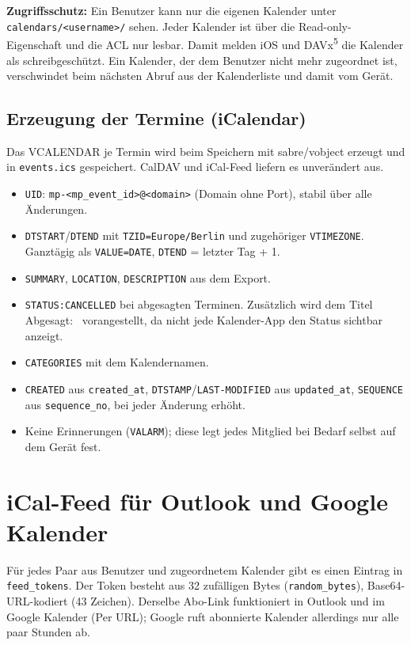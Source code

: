 \documentclass[a4paper,fontsize=10pt]{scrartcl}
\newcommand{\code}[1]{\texttt{#1}}
\begin{document}
\textbf{Zugriffsschutz:} Ein Benutzer kann nur die eigenen Kalender unter
\code{calendars/<username>/} sehen. Jeder Kalender ist über die
Read-only-Eigenschaft und die ACL nur lesbar. Damit melden iOS und
DAVx\textsuperscript{5} die Kalender als schreibgeschützt. Ein
Kalender, der dem Benutzer nicht mehr zugeordnet ist, verschwindet beim
nächsten Abruf aus der Kalenderliste und damit vom Gerät.

\subsection{Erzeugung der Termine (iCalendar)}

Das VCALENDAR je Termin wird beim Speichern mit sabre/vobject erzeugt und in
\code{events.ics} gespeichert. CalDAV und iCal-Feed liefern es unverändert
aus.

\begin{itemize}
  \item \code{UID}: \code{mp-<mp\_event\_id>@<domain>} (Domain ohne Port),
        stabil über alle Änderungen.
  \item \code{DTSTART}/\code{DTEND} mit \code{TZID=Europe/Berlin} und
        zugehöriger \code{VTIMEZONE}. Ganztägig als \code{VALUE=DATE},
        \code{DTEND} = letzter Tag + 1.
  \item \code{SUMMARY}, \code{LOCATION}, \code{DESCRIPTION} aus dem Export.
  \item \code{STATUS:CANCELLED} bei abgesagten Terminen. Zusätzlich wird
        dem Titel \glqq Abgesagt: \grqq\ vorangestellt, da nicht jede
        Kalender-App den Status sichtbar anzeigt.
  \item \code{CATEGORIES} mit dem Kalendernamen.
  \item \code{CREATED} aus \code{created\_at},
        \code{DTSTAMP}/\code{LAST-MODIFIED} aus \code{updated\_at},
        \code{SEQUENCE} aus \code{sequence\_no}, bei jeder Änderung erhöht.
  \item Keine Erinnerungen (\code{VALARM}); diese legt jedes Mitglied bei
        Bedarf selbst auf dem Gerät fest.
\end{itemize}

\section{iCal-Feed für Outlook und Google Kalender}

Für jedes Paar aus Benutzer und zugeordnetem Kalender gibt es einen Eintrag
in \code{feed\_tokens}. Der Token besteht aus 32 zufälligen Bytes
(\code{random\_bytes}), Base64-URL-kodiert (43 Zeichen). Derselbe Abo-Link
funktioniert in Outlook und im Google Kalender (\glqq Per URL\grqq); Google
ruft abonnierte Kalender allerdings nur alle paar Stunden ab.
\end{document}
